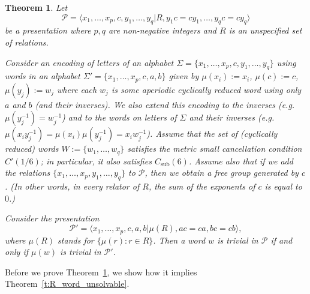 \documentclass[10pt,a4paper]{article}
\newtheorem{theorem}{Theorem}
\theoremstyle{definition}
\theoremstyle{remark}
\newcommand\PP{\mathcal{P}}
\DeclareMathOperator{\sub}{sub}
\begin{document}
\begin{theorem}
  \label{t:encoding}
  Let 
  \[\PP = \langle x_1, \dots, x_p, c, y_1, \dots, y_q| R, y_1 c = c y_1, \dots,
  y_q c = c y_q \rangle\] 
  be a presentation where $p, q$ are non-negative integers and $R$ is an
  unspecified set of relations. 
 
  Consider an encoding of letters of an alphabet $\Sigma = \{x_1, \dots, x_p, c,
  y_1, \dots, y_q\}$ using words in an alphabet $\Sigma' = \{x_1, \dots, x_p, c,
	a, b\}$ given by $\mu(x_i) := x_i$, $\mu(c) := c$, $\mu(y_j) := w_j$ where each $w_j$  is some aperiodic cyclically reduced word using only $a$ and $b$ (and their inverses). We also extend this
  encoding to the inverses (e.g. $\mu(y_j^{-1}) = w_j^{-1}$) and to the words on
  letters of $\Sigma$ and their inverses (e.g. $\mu(x_iy_j^{-1}) =
  \mu(x_i)\mu(y_j^{-1}) = x_iw_j^{-1}$). Assume that the set of (cyclically
  reduced) words $W := \{w_1, \dots,
  w_q\}$ satisfies the metric small cancellation condition $C'(1/6)$; in
  particular, it also satisfies $C_{\sub}(6)$. Assume also
  that if we add
  the relations $\{x_1, \dots, x_p, y_1, \dots, y_q\}$ to $\PP$, then we obtain a
  free group generated by $c$.
  (In other
  words, in every relator of $R$, the sum of the exponents of $c$ is equal to
  $0$.)

  Consider the presentation
  \[\PP' = \langle x_1, \dots, x_p, c, a, b| \mu(R), ac = ca, bc = cb\rangle,\] 
  where $\mu(R)$ stands for $\{\mu(r) \colon r \in R\}$. Then a word $w$ is
  trivial in $\PP$ if and only if $\mu(w)$ is trivial in $\PP'$. 
\end{theorem}

Before we prove Theorem~\ref{t:encoding}, we show how it implies
Theorem~\ref{t:R_word_unsolvable}.
\end{document}
